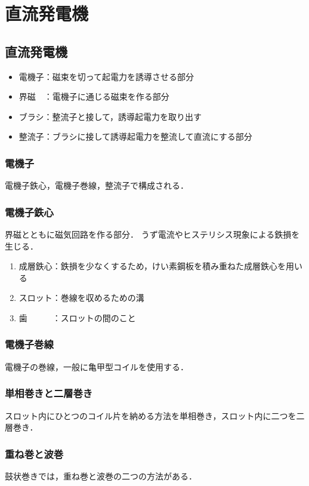 \section{直流発電機}
\subsection{直流発電機}
\begin{itemize}
  \item 電機子：磁束を切って起電力を誘導させる部分
  \item 界磁　：電機子に通じる磁束を作る部分
  \item ブラシ：整流子と接して，誘導起電力を取り出す
  \item 整流子：ブラシに接して誘導起電力を整流して直流にする部分
\end{itemize}

\subsubsection{電機子}
電機子鉄心，電機子巻線，整流子で構成される．

\subsubsection{電機子鉄心}
界磁とともに磁気回路を作る部分．
うず電流やヒステリシス現象による鉄損を生じる．
\begin{enumerate}
  \item 成層鉄心：鉄損を少なくするため，けい素鋼板を積み重ねた成層鉄心を用いる
  \item スロット：巻線を収めるための溝
  \item 歯　　　：スロットの間のこと
\end{enumerate}

\subsubsection{電機子巻線}
電機子の巻線，一般に亀甲型コイルを使用する．

\subsubsection{単相巻きと二層巻き}
スロット内にひとつのコイル片を納める方法を単相巻き，スロット内に二つを二層巻き．
\subsubsection{重ね巻と波巻}
鼓状巻きでは，重ね巻と波巻の二つの方法がある．
